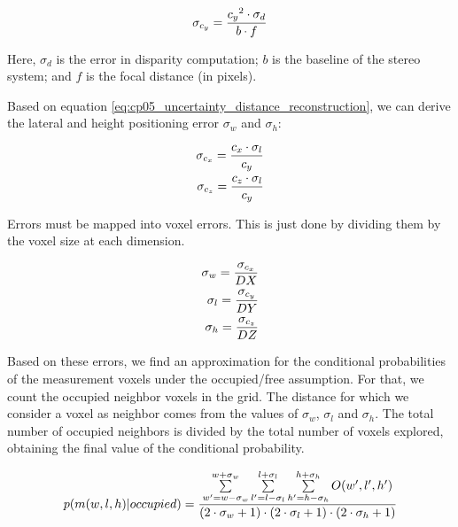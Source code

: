 \begin{equation}\label{eq:cp05_uncertainty_distance_reconstruction}
\sigma_{c_y}={{{c_y}^2 \cdot \sigma_d} \over {b \cdot f}}
\end{equation}

Here, $\sigma_d$ is the error in disparity computation; $b$ is the baseline of the stereo system; and $f$ is the focal distance (in pixels).

Based on equation \ref{eq:cp05_uncertainty_distance_reconstruction}, we can derive the lateral and height positioning error $\sigma_w$ and $\sigma_h$:

\begin{equation}\label{eq:cp05_uncertainty_lateral_and_height_reconstruction}
\begin{align}
\sigma_{c_x}={{{c_x} \cdot \sigma_l} \over {c_y}} \\
\sigma_{c_z}={{{c_z} \cdot \sigma_l} \over {c_y}}
\end{align}
\end{equation}

Errors must be mapped into voxel errors. This is just done by dividing them by the voxel size at each dimension.

\begin{equation}\label{eq:cp05_uncertainty_voxel_errors}
\begin{align}
\sigma_w={{\sigma_{c_x}} \over {DX}} \\
\sigma_l={{\sigma_{c_y}} \over {DY}} \\
\sigma_h={{\sigma_{c_z}} \over {DZ}}
\end{align}
\end{equation}

Based on these errors, we find an approximation for the conditional probabilities of the measurement voxels under the occupied/free assumption. For that, we count the occupied neighbor voxels in the grid. The distance for which we consider a voxel as neighbor comes from the values of $\sigma_w$, $\sigma_l$ and $\sigma_h$. The total number of occupied neighbors is divided by the total number of voxels explored, obtaining the final value of the conditional probability.

\begin{equation}\label{eq:cp05_conditional_prob}
p(m(w,l,h)|occupied) = {
{\sum \limits_{w'=w-\sigma_w}^{w+\sigma_w} \sum \limits_{l'=l-\sigma_l}^{l+\sigma_l} \sum \limits_{h'=h-\sigma_h}^{h+\sigma_h} O(w',l',h')} 
\over 
{(2 \cdot \sigma_w + 1) \cdot (2 \cdot \sigma_l + 1) \cdot (2 \cdot \sigma_h + 1)}}
\end{equation}

